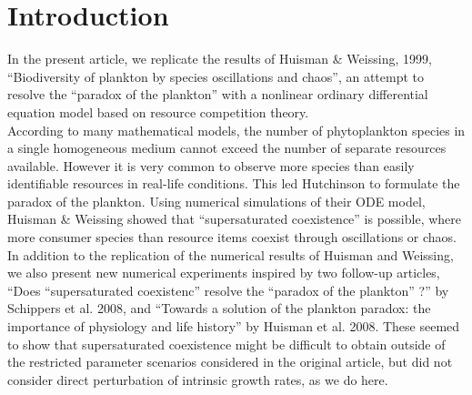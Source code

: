 \section{Introduction}
In the present article, we replicate the results of Huisman  \&  Weissing, 1999, 
``Biodiversity of plankton by species oscillations and 
chaos''\supercite{1999:Huisman}, an attempt to resolve the ``paradox of 
the plankton''\supercite{1961:Hutchinson} with a nonlinear ordinary differential equation model based on resource competition theory.\\

According to many mathematical models, the number of phytoplankton species in a 
single homogeneous medium cannot exceed the number of separate resources 
available\supercite{1960:Hardin,1973:Phillips,1980:Armstrong}. However it is 
very common to observe more species than easily identifiable resources in real-life conditions. This 
led Hutchinson to formulate the paradox of the plankton\supercite{1961:Hutchinson}. Using 
numerical simulations of their ODE model, Huisman \& Weissing\supercite{1999:Huisman} showed that 
``supersaturated coexistence'' is possible, where more consumer species than resource items coexist through oscillations or chaos.\\

In addition to the replication of the numerical results of Huisman and Weissing, we also present new numerical experiments inspired by two follow-up articles, ``Does ``supersaturated coexistenc'' resolve the ``paradox of the plankton'' 
?'' by Schippers et al. 2008\supercite{2008:Schippers}, and ``Towards a solution of the plankton paradox: the  importance of physiology and life history” by Huisman et al. 2008\supercite{2008:Huisman}. 
These seemed to show that supersaturated coexistence might be difficult to obtain outside of the restricted parameter scenarios considered in the original article, but did not consider direct perturbation of intrinsic growth rates, as we do here. 

